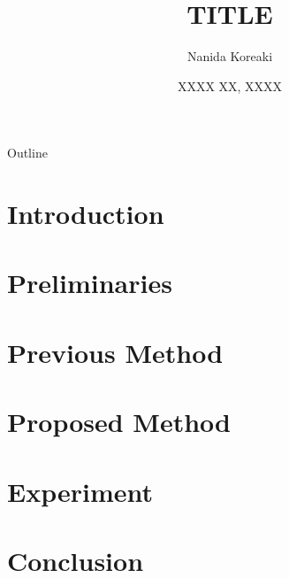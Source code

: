 \documentclass[aspectratio=169, 10.5pt]{beamer}
\title[TITLE]{TITLE}
\institute[XXXX XXXX Lab.]{XXXX XXXX Lab.}
\author[Nanida Koreaki]{Nanida Koreaki}
\date[XXXX XX, XXXX]{XXXX XX, XXXX}
\begin{document}
\begin{frame}
    \titlepage
\end{frame}

\begin{frame}{Outline}
    \tableofcontents
\end{frame}

\section{Introduction}


\section{Preliminaries}


\section{Previous Method}


\section{Proposed Method}


\section{Experiment}


\section{Conclusion}



\end{document}
